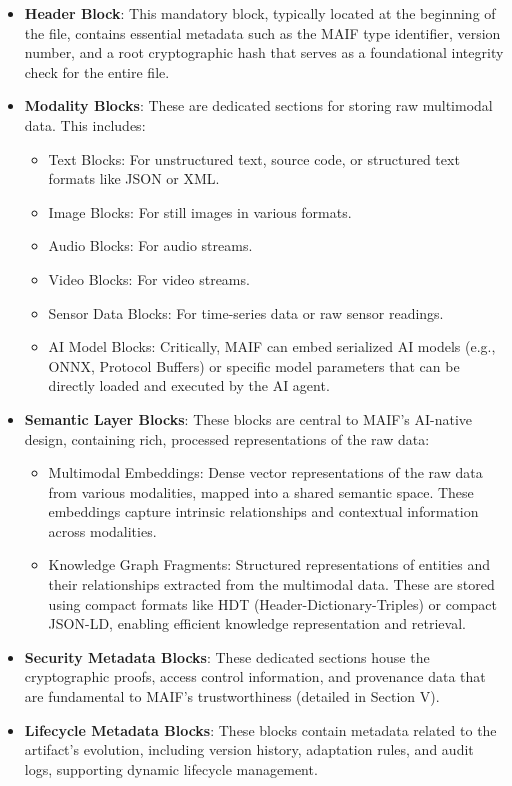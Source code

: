 \documentclass[conference]{IEEEtran}
\begin{document}
\begin{itemize}[leftmargin=*]
\item \textbf{Header Block}: This mandatory block, typically located at the beginning of the file, contains essential metadata such as the MAIF type identifier, version number, and a root cryptographic hash that serves as a foundational integrity check for the entire file.

\item \textbf{Modality Blocks}: These are dedicated sections for storing raw multimodal data. This includes:
\begin{itemize}
\item Text Blocks: For unstructured text, source code, or structured text formats like JSON or XML.
\item Image Blocks: For still images in various formats.
\item Audio Blocks: For audio streams.
\item Video Blocks: For video streams.
\item Sensor Data Blocks: For time-series data or raw sensor readings.
\item AI Model Blocks: Critically, MAIF can embed serialized AI models (e.g., ONNX, Protocol Buffers) or specific model parameters that can be directly loaded and executed by the AI agent\cite{ref41}.
\end{itemize}

\item \textbf{Semantic Layer Blocks}: These blocks are central to MAIF's AI-native design, containing rich, processed representations of the raw data:
\begin{itemize}
\item Multimodal Embeddings: Dense vector representations of the raw data from various modalities, mapped into a shared semantic space. These embeddings capture intrinsic relationships and contextual information across modalities\cite{ref26}.
\item Knowledge Graph Fragments: Structured representations of entities and their relationships extracted from the multimodal data. These are stored using compact formats like HDT (Header-Dictionary-Triples) or compact JSON-LD, enabling efficient knowledge representation and retrieval\cite{ref42}.
\end{itemize}

\item \textbf{Security Metadata Blocks}: These dedicated sections house the cryptographic proofs, access control information, and provenance data that are fundamental to MAIF's trustworthiness (detailed in Section V).

\item \textbf{Lifecycle Metadata Blocks}: These blocks contain metadata related to the artifact's evolution, including version history, adaptation rules, and audit logs, supporting dynamic lifecycle management\cite{ref12}.
\end{itemize}
\end{document}
